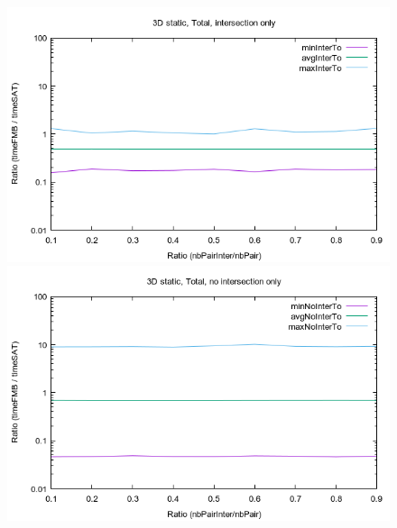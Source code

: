\documentclass[12pt, a4paper]{article}
\begin{document}
\begin{center}
\begin{figure}[H]
\centering\includegraphics[width=12cm]{../Results/qualification3Dinter.png}\\
\centering\includegraphics[width=12cm]{../Results/qualification3Dnointer.png}\\
\end{figure}
\end{center}
\end{document}
